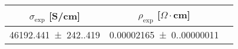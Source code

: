 \begin{tabular}{ccc}
\toprule
$\sigma_{\exp}$ [S/cm] & $\rho_{\exp}$ [$\Omega  \cdot$cm] \\
\midrule
\num{46192.441(242.419)} & \num{0.00002165(0.00000011)} \\
\bottomrule
\end{tabular}
